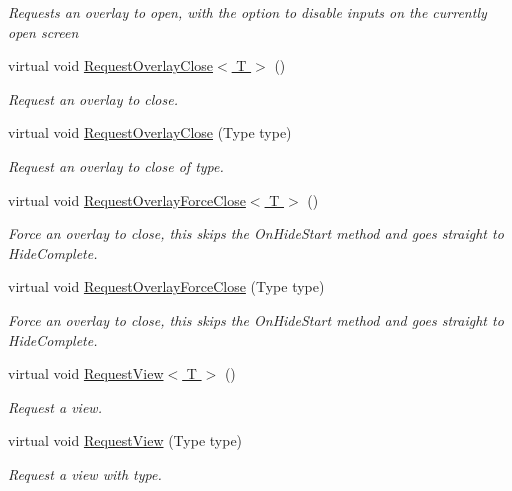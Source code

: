 \begin{DoxyCompactItemize}
\begin{DoxyCompactList}\small\item\em Requests an overlay to open, with the option to disable inputs on the currently open screen \end{DoxyCompactList}\item 
virtual void \hyperlink{class_scaffolding_1_1_view_request_a614cdfd9b456ef39d9294c4f0a5d4a4b}{Request\+Overlay\+Close$<$ T $>$} ()
\begin{DoxyCompactList}\small\item\em Request an overlay to close. \end{DoxyCompactList}\item 
virtual void \hyperlink{class_scaffolding_1_1_view_request_a8e2b65d409c7b4ff692753ce5825e9de}{Request\+Overlay\+Close} (Type type)
\begin{DoxyCompactList}\small\item\em Request an overlay to close of type. \end{DoxyCompactList}\item 
virtual void \hyperlink{class_scaffolding_1_1_view_request_ad546a557c876f40350a0aa87e3df051f}{Request\+Overlay\+Force\+Close$<$ T $>$} ()
\begin{DoxyCompactList}\small\item\em Force an overlay to close, this skips the On\+Hide\+Start method and goes straight to Hide\+Complete. \end{DoxyCompactList}\item 
virtual void \hyperlink{class_scaffolding_1_1_view_request_a9245c7504ef075c0a800b1d63db3a7c4}{Request\+Overlay\+Force\+Close} (Type type)
\begin{DoxyCompactList}\small\item\em Force an overlay to close, this skips the On\+Hide\+Start method and goes straight to Hide\+Complete. \end{DoxyCompactList}\item 
virtual void \hyperlink{class_scaffolding_1_1_view_request_acacc176c1e97491d4ed539b71a0576c8}{Request\+View$<$ T $>$} ()
\begin{DoxyCompactList}\small\item\em Request a view. \end{DoxyCompactList}\item 
virtual void \hyperlink{class_scaffolding_1_1_view_request_a6049ec6f948d31b1f38252f8c330aa34}{Request\+View} (Type type)
\begin{DoxyCompactList}\small\item\em Request a view with type. \end{DoxyCompactList}\item 

\end{DoxyCompactItemize}
